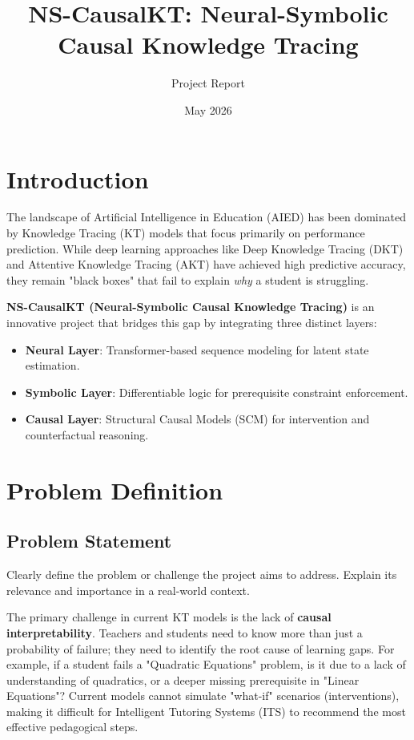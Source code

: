 \documentclass[12pt,a4paper]{article}
\title{\textbf{NS-CausalKT: Neural-Symbolic Causal Knowledge Tracing}}
\author{Project Report}
\date{May 2026}
\begin{document}
\maketitle
\tableofcontents
\newpage

\section{Introduction}
The landscape of Artificial Intelligence in Education (AIED) has been dominated by Knowledge Tracing (KT) models that focus primarily on performance prediction. While deep learning approaches like Deep Knowledge Tracing (DKT) and Attentive Knowledge Tracing (AKT) have achieved high predictive accuracy, they remain "black boxes" that fail to explain \textit{why} a student is struggling.

\textbf{NS-CausalKT (Neural-Symbolic Causal Knowledge Tracing)} is an innovative project that bridges this gap by integrating three distinct layers:
\begin{itemize}
    \item \textbf{Neural Layer}: Transformer-based sequence modeling for latent state estimation.
    \item \textbf{Symbolic Layer}: Differentiable logic for prerequisite constraint enforcement.
    \item \textbf{Causal Layer}: Structural Causal Models (SCM) for intervention and counterfactual reasoning.
\end{itemize}

\section{Problem Definition}

\subsection{Problem Statement}
Clearly define the problem or challenge the project aims to address. Explain its relevance and importance in a real-world context.

The primary challenge in current KT models is the lack of \textbf{causal interpretability}. Teachers and students need to know more than just a probability of failure; they need to identify the root cause of learning gaps. For example, if a student fails a "Quadratic Equations" problem, is it due to a lack of understanding of quadratics, or a deeper missing prerequisite in "Linear Equations"? Current models cannot simulate "what-if" scenarios (interventions), making it difficult for Intelligent Tutoring Systems (ITS) to recommend the most effective pedagogical steps.
\end{document}
